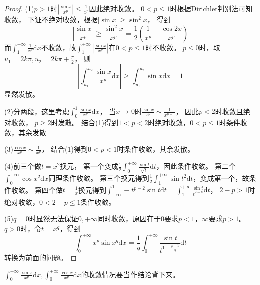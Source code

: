 \begin{proof}
  (1)$p > 1$时$|\frac{\sin x}{x^p}| \leq \frac{1}{x^p}$因此绝对收敛。
  $0 < p \leq 1$时根据Dirichlet判别法可知收敛，
  下证不绝对收敛，根据$|\sin x| \geq \sin^2 x$，
  得到
  \begin{equation*}
    \left| \frac{\sin x}{x^p} \right| \geq \frac{\sin^2x}{x^p} = \frac{1}{2} \left( \frac{1}{x^p} - \frac{\cos 2x}{x^p} \right)
  \end{equation*}
  而$\int_1^{+\infty}\frac{1}{x^p}\mathrm{d}x$不收敛，故$\int_1^{+\infty} \left| \frac{\sin x}{x^p} \right|$在$0 < p \leq 1$时不收敛。
  $p \leq 0$时，取$u_1 = 2k\pi, u_2 = 2k\pi + \frac{\pi}{2}$，
  则
  \begin{equation*}
    \left| \int_{u_1}^{u_2} \frac{\sin x}{x^p}\mathrm{d} x \right| \geq \int_{u_1}^{u_2} \sin x\mathrm{d}x = 1
  \end{equation*}
  显然发散。

  (2)分两段，这里考虑$\int_0^1 \frac{\sin x}{x^p}\mathrm{d} x$，
  当$x \rightarrow 0$时$\frac{\sin x}{x^p} \sim \frac{1}{x^{p-1}}$，
  因此$p < 2$时收敛且绝对收敛，
  $p \geq 2$时发散。
  结合(1)得到$1 < p < 2$时绝对收敛，$0 < p \leq 1$时条件收敛，其余发散

  (3)$\frac{\cos x}{x^p} \sim \frac{1}{x^p}$，
  结合(1)得到$0 < p < 1$时条件收敛，其余发散。

  (4)前三个做$t = x^2$换元，
  第一个变成$\frac{1}{2}\int_0^{+\infty} \frac{\sin t}{\sqrt{t}}  \mathrm{d} t$，因此条件收敛。
  第二个$\int_0^{+\infty} \cos x^2 \mathrm{d} x$同理条件收敛。
  第三个换元得到$\frac{1}{2}\int _1^{+\infty}\sin t^2 \mathrm{d}t$，变成第一个，故条件收敛。
  第四个做$t = \frac{1}{x}$换元得到$\int_{+\infty}^1 -t^{p-2} \sin t \mathrm{d} t = \int_1^{+\infty} \frac{\sin t}{t^{2-p}}\mathrm{d} t$，
  $2-p > 1$时绝对收敛，$0 < 2-p \leq 1$条件收敛。

  (5)$q = 0$时显然无法保证$0,+\infty$同时收敛，原因在于$0$要求$p < 1$，$\infty$要求$p > 1$。
  $q > 0$时，令$t = x^q$，得到
  \begin{equation*}
    \int_0^{+\infty}x^p \sin x^q \mathrm{d} x = \frac{1}{q} \int_0^{+\infty} \frac{\sin t}{t^{1- \frac{p+1}{q}}}\mathrm{d} t
  \end{equation*}
  转换为前面的问题。
\end{proof}

\begin{note}
  $\int_0^{+\infty}\frac{\sin x}{x^p}\mathrm{d} x, \int_0^{+\infty} \frac{\cos x}{x^p}\mathrm{d} x$的收敛情况要当作结论背下来。
\end{note}

